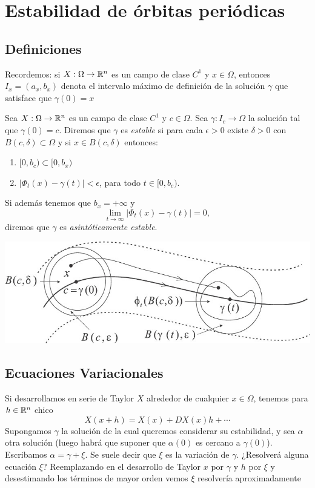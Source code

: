 \section{Estabilidad de órbitas periódicas}

\subsection{Definiciones} 
 Recordemos: si $X:\Omega\to\mathbb{R}^n$ es un campo de clase $C^1$ y  $x\in\Omega$, entonces $I_x=(a_x,b_x)$ denota el intervalo máximo
 de definición de la solución $\gamma$ que satisface que $\gamma(0)=x$

 \begin{definicion}{}
 Sea $X:\Omega\to\mathbb{R}^n$ es un campo de clase $C^1$ y  $c\in\Omega$. Sea $\gamma:I_c\to\Omega$ la solución tal que 
 $\gamma(0)=c$. Diremos que $\gamma$ es \emph{estable} si para cada $\epsilon>0$ existe $\delta>0$ con 
 $B(c,\delta)\subset\Omega$ y si $x\in B(c,\delta)$ entonces:
 \begin{enumerate}
  \item $[0,b_c)\subset [0,b_x)$
  \item $|\Phi_t(x)-\gamma(t)|<\epsilon$, para todo $t\in[0,b_c)$. 
 \end{enumerate}
  Si además tenemos que $b_x=+\infty$ y
 \[\lim_{t\to\infty}|\Phi_t(x)-\gamma(t)|=0, \]
 diremos que $\gamma$ es \emph{asintóticamente estable}.
\end{definicion}


   \begin{center}
   \includegraphics[scale=0.4]{imagenes/estabilidad_gral.jpg}
   \end{center}




\subsection{Ecuaciones Variacionales}

 Si desarrollamos en serie de Taylor $X$ alrededor de cualquier $x\in\Omega$, tenemos para $h\in\mathbb{R}^n$ chico
 \[X(x+h)=X(x)+DX(x)h+\cdots\]
Supongamos $\gamma$ la solución de la cual queremos considerar su estabilidad, y sea $\alpha$ otra solución 
(luego habrá que suponer que $\alpha(0)$ es cercano a $\gamma(0)$). Escribamos $\alpha=\gamma+\xi$. Se suele
decir que $\xi$ es la variación de $\gamma$. ¿Resolverá alguna ecuación $\xi$? Reemplazando en el desarrollo de Taylor
$x$ por $\gamma$ y $h$ por $\xi$ y desestimando los términos de mayor orden vemos $\xi$ resolvería aproximadamente

